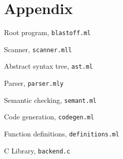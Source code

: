 \section{Appendix}

Root program, \verb=blastoff.ml=

Scanner, \verb=scanner.mll=

Abstract syntax tree, \verb=ast.ml=

Parser, \verb=parser.mly=

Semantic checking, \verb=semant.ml=

Code generation, \verb=codegen.ml=

Function definitions, \verb=definitions.ml=

C Library, \verb=backend.c=

